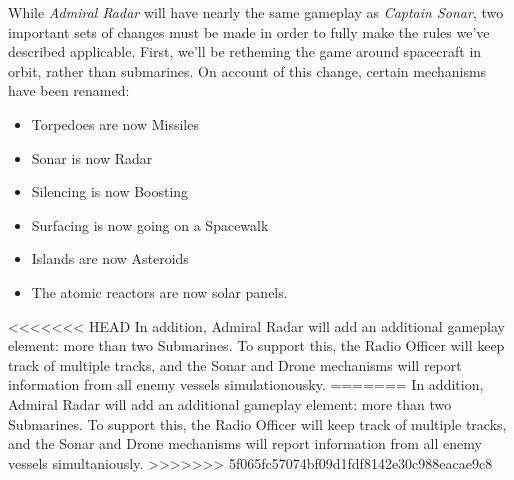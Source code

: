 While \textit{Admiral Radar} will have nearly the same gameplay as \textit{Captain Sonar}, two important sets of changes must be made in order to fully make the rules we've described applicable. First, we'll be retheming the game around spacecraft in orbit, rather than submarines. On account of this change, certain mechanisms have been renamed:

\begin{itemize}
\item Torpedoes are now Missiles
\item Sonar is now Radar
\item Silencing is now Boosting
\item Surfacing is now going on a Spacewalk
\item Islands are now Asteroids
\item The atomic reactors are now solar panels.
\end{itemize}

<<<<<<< HEAD
In addition, Admiral Radar will add an additional gameplay element: more than two Submarines. To support this, the Radio Officer will keep track of multiple tracks, and the Sonar and Drone mechanisms will report information from all enemy vessels simulationousky. 
=======
In addition, Admiral Radar will add an additional gameplay element: more than two Submarines. To support this, the Radio Officer will keep track of multiple tracks, and the Sonar and Drone mechanisms will report information from all enemy vessels simultaniously. 
>>>>>>> 5f065fc57074bf09d1fdf8142e30c988eacae9c8
